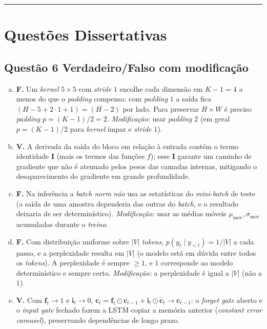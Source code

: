 \documentclass[11pt,a4paper]{article}
\begin{document}
\color{black}
\rule{\linewidth}{0.4pt}

\section*{Questões Dissertativas}

\color{blue}

\subsection*{Questão 6 \textemdash{} Verdadeiro/Falso com modificação}

\begin{enumerate}[a)]
    \item \textbf{F.} Um \textit{kernel} $5\times 5$ com \textit{stride} $1$ encolhe cada dimensão em $K - 1 = 4$ a menos do que o \textit{padding} compensa: com \textit{padding} $1$ a saída fica $(H - 5 + 2\cdot 1 + 1) = (H - 2)$ por lado. Para preservar $H\times W$ é preciso \textit{padding} $p = (K-1)/2 = 2$. \textit{Modificação:} usar \textit{padding} $2$ (em geral $p = (K-1)/2$ para \textit{kernel} ímpar e \textit{stride} $1$).

    \item \textbf{V.} A derivada da saída do bloco em relação à entrada contém o termo identidade $\mathbf{I}$ (mais os termos das funções $f$); esse $\mathbf{I}$ garante um caminho de gradiente que não é atenuado pelos pesos das camadas internas, mitigando o desaparecimento do gradiente em grande profundidade.

    \item \textbf{F.} Na inferência a \textit{batch norm} \emph{não} usa as estatísticas do \textit{mini-batch} de teste (a saída de uma amostra dependeria das outras do \textit{batch}, e o resultado deixaria de ser determinístico). \textit{Modificação:} usar as médias móveis $\mu_{\text{mov}}, \sigma_{\text{mov}}$ acumuladas durante o \emph{treino}.

    \item \textbf{F.} Com distribuição uniforme sobre $|V|$ \textit{tokens}, $p(y_t \mid y_{<t}) = 1/|V|$ a cada passo, e a perplexidade resulta em $|V|$ (o modelo está em dúvida entre todos os \textit{tokens}). A perplexidade é sempre $\ge 1$, e $1$ corresponde ao modelo determinístico e sempre certo. \textit{Modificação:} a perplexidade é igual a $|V|$ (não a $1$).

    \item \textbf{V.} Com $\mathbf{f}_t \to 1$ e $\mathbf{i}_t \to 0$, $\mathbf{c}_t = \mathbf{f}_t\odot \mathbf{c}_{t-1} + \mathbf{i}_t \odot \tilde{\mathbf{c}}_t \to \mathbf{c}_{t-1}$: o \textit{forget gate} aberto e o \textit{input gate} fechado fazem a LSTM copiar a memória anterior (\textit{constant error carousel}), preservando dependências de longo prazo.
\end{enumerate}
\end{document}
